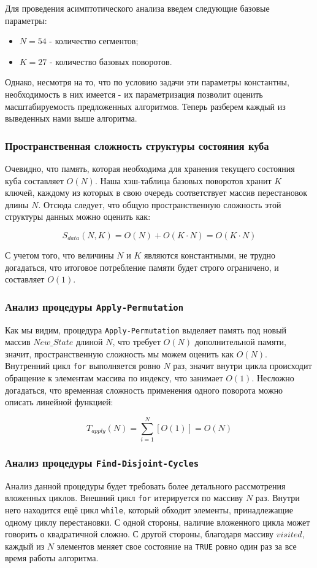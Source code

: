 \documentclass{article}
\begin{document}
Для проведения асимптотического анализа введем следующие базовые параметры:
\begin{itemize}
\item $N = 54$ - количество сегментов;
\item $K = 27$ - количество базовых поворотов.
\end{itemize}
Однако, несмотря на то, что по условию задачи эти параметры константны, необходимость в них имеется - их параметризация позволит оценить масштабируемость предложенных алгоритмов. Теперь разберем каждый из выведенных нами выше алгоритма.

\subsubsection{Пространственная сложность структуры состояния куба}
Очевидно, что память, которая необходима для хранения текущего состояния куба составляет $O(N)$. Наша хэш-таблица базовых поворотов хранит $K$ ключей, каждому из которых в свою очередь соответствует массив перестановок длины $N$. Отсюда следует, что общую пространственную сложность этой структуры данных можно оценить как:

\begin{equation}
S_{data}(N, K) = O(N) + O(K\cdot N) = O(K\cdot N)
\end{equation}

С учетом того, что величины $N$ и $K$ являются константными, не трудно догадаться, что итоговое потребление памяти будет строго ограничено, и составляет $O(1)$.

\subsubsection{Анализ процедуры \texttt{Apply-Permutation}}
Как мы видим, процедура \texttt{Apply-Permutation} выделяет память под новый массив $New\_State$ длиной $N$, что требует $O(N)$ дополнительной памяти, значит, пространственную сложность мы можем оценить как $O(N)$. Внутренний цикл \texttt{for} выполняется ровно $N$ раз, значит внутри цикла происходит обращение к элементам массива по индексу, что занимает $O(1)$. Несложно догадаться, что временная сложность применения одного поворота можно описать линейной функцией:

\begin{equation}
T_{apply}(N) = \sum_{i=1}^{N}\left[O(1)\right] = O(N) 
\end{equation}

\subsubsection{Анализ процедуры \texttt{Find-Disjoint-Cycles}}
Анализ данной процедуры будет требовать более детального рассмотрения вложенных циклов. Внешний цикл \texttt{for} итерируется по массиву $N$ раз. Внутри него находится ещё цикл \texttt{while}, который обходит элементы, принадлежащие одному циклу перестановки. С одной стороны, наличие вложенного цикла может говорить о квадратичной сложно. С другой стороны, благодаря массиву $visited$, каждый из $N$ элементов меняет свое состояние на \texttt{TRUE} ровно один раз за все время работы алгоритма. 
\end{document}
